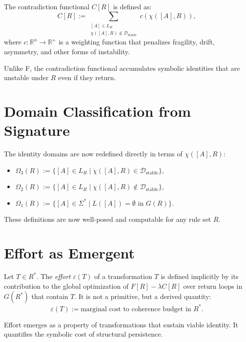 \begin{definition}
The contradiction functional $C[R]$ is defined as:
\begin{equation}
C[R] := \sum_{\substack{[A] \in L_R \\ \chi([A], R) \notin \mathcal{D}_{\text{stable}}}} c(\chi([A], R)),
\end{equation}
where $c: \mathbb{R}^n \to \mathbb{R}^+$ is a weighting function that penalizes fragility, drift, asymmetry, and other forms of instability.
\end{definition}

\noindent
Unlike F, the contradiction functional accumulates symbolic identities that are unstable under $R$ even if they return.

\section{Domain Classification from Signature}

The identity domains are now redefined directly in terms of $\chi([A], R)$:

\begin{itemize}
    \item $\Omega_3(R)$ := $\{ [A] \in L_R \mid \chi([A], R) \in \mathcal{D}_{\text{stable}} \}$,
    \item $\Omega_2(R)$ := $\{ [A] \in L_R \mid \chi([A], R) \notin \mathcal{D}_{\text{stable}} \}$,
    \item $\Omega_1(R)$ := $\{ [A] \in \Sigma^* \mid L([A]) = \emptyset \text{ in } G(R) \}$.
\end{itemize}

\noindent
These definitions are now well-posed and computable for any rule set $R$.

\section{Effort as Emergent}

\begin{definition}[Effort]
Let $T \in R^*$. The \emph{effort} $\varepsilon(T)$ of a transformation $T$ is defined implicitly by its contribution to the global optimization of $F[R] - \lambda C[R]$ over return loops in $G(R^*)$ that contain $T$. It is not a primitive, but a derived quantity:
\[
\varepsilon(T) := \text{marginal cost to coherence budget in $R^*$}.
\]
\end{definition}

\noindent
Effort emerges as a property of transformations that sustain viable identity. It quantifies the symbolic cost of structural persistence.

